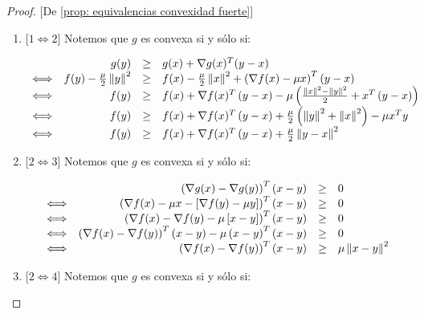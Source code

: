 \begin{proof}{[De \ref{prop: equivalencias convexidad fuerte}]}
	\begin{enumerate}
		\item {[$1 \Longleftrightarrow 2$]} Notemos que $g$ es convexa si y s\'olo si:
		
		\begin{equation*}
			\begin{array}{lrcl}
				& g(y) & \geq & g(x) + \nabla g(x) ^T (y-x) \\
				\Longleftrightarrow & f(y) - \frac{\mu}{2}\left\lVert y\right\rVert^2 & \geq & f(x) - \frac{\mu}{2}\left\lVert x\right\rVert^2 + \left(\nabla f(x) - \mu x \right)^T \left(y -x\right) \\
				\Longleftrightarrow & f(y) & \geq & f(x) + \nabla f(x)^T \left(y-x\right) - \mu \left(\frac{\left\lVert x\right\rVert^2 - \left\lVert y\right\rVert^2}{2} +  x^T \left(y-x\right)\right) \\
				\Longleftrightarrow & f(y) & \geq & f(x) + \nabla f(x)^T \left(y-x\right) + \frac{\mu}{2} \left(\left\lVert y\right\rVert^2 + \left\lVert x\right\rVert^2\right) - \mu x^T y \\
				\Longleftrightarrow & f(y) & \geq & f(x) + \nabla f(x)^T \left(y-x\right) + \frac{\mu}{2} \left\lVert y-x\right\rVert^2
			\end{array}
		\end{equation*}
		
		\item {[$2 \Longleftrightarrow 3$]} Notemos que $g$ es convexa si y s\'olo si:
		
		\begin{equation*}
			\begin{array}{lrcl}
				& \left( \nabla g(x) - \nabla g(y) \right)^T \left(x-y\right) & \geq & 0 \\
				\Longleftrightarrow & \left(\nabla f(x) - \mu x - \left[\nabla f (y) - \mu y\right]\right)^T \left(x-y\right) & \geq & 0\\
				\Longleftrightarrow & \left(\nabla f(x) - \nabla f (y) - \mu \left[x - y\right]\right)^T\left(x-y\right) & \geq & 0 \\
				\Longleftrightarrow & \left(\nabla f(x) - \nabla f (y) \right)^T \left(x-y\right)  - \mu \left(x-y\right)^T \left(x-y\right) & \geq & 0 \\
				\Longleftrightarrow & \left(\nabla f(x) - \nabla f (y) \right)^T \left(x-y\right)  & \geq & \mu  \left\lVert x-y\right\rVert^2
			\end{array}
		\end{equation*}
		
		\item {[$2 \Longleftrightarrow 4$]} Notemos que $g$ es convexa si y s\'olo si:
		

\end{enumerate}
\end{proof}
